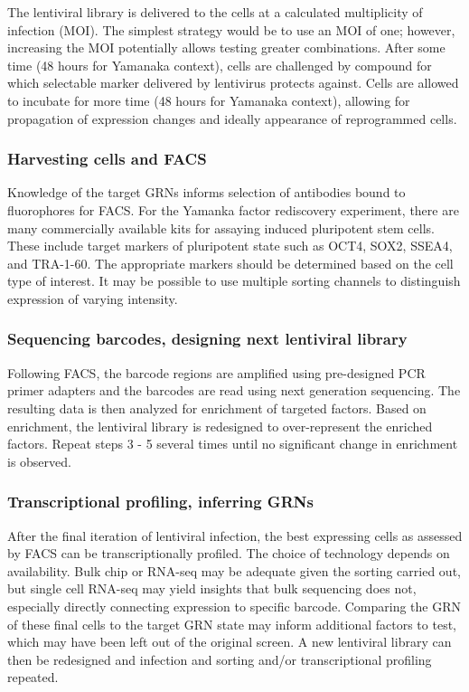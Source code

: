 \documentclass[10pt]{article}
\begin{document}
The lentiviral library is delivered to the cells at a calculated multiplicity of infection (MOI). The simplest strategy would be to use an MOI of one; however, increasing the MOI potentially allows testing greater combinations. After some time (48 hours for Yamanaka context), cells are challenged by compound for which selectable marker delivered by lentivirus protects against. Cells are allowed to incubate for more time (48 hours for Yamanaka context), allowing for propagation of expression changes and ideally appearance of reprogrammed cells.

\subsubsection{Harvesting cells and FACS}

Knowledge of the target GRNs informs selection of antibodies bound to fluorophores for FACS. For the Yamanka factor rediscovery experiment, there are many commercially available kits for assaying induced pluripotent stem cells. These include target markers of pluripotent state such as OCT4, SOX2, SSEA4, and TRA-1-60. The appropriate markers should be determined based on the cell type of interest. It may be possible to use multiple sorting channels to distinguish expression of varying intensity.

\subsubsection{Sequencing barcodes, designing next lentiviral library}

Following FACS, the barcode regions are amplified using pre-designed PCR primer adapters \cite{cheng2014enhanced} and the barcodes are read using next generation sequencing. The resulting data is then analyzed for enrichment of targeted factors. Based on enrichment, the lentiviral library is redesigned to over-represent the enriched factors. Repeat steps 3 - 5 several times until no significant change in enrichment is observed.

\subsubsection{Transcriptional profiling, inferring GRNs}

After the final iteration of lentiviral infection, the best expressing cells as assessed by FACS can be transcriptionally profiled. The choice of technology depends on availability. Bulk chip or RNA-seq may be adequate given the sorting carried out, but single cell RNA-seq may yield insights that bulk sequencing does not, especially directly connecting expression to specific barcode. Comparing the GRN of these final cells to the target GRN state may inform additional factors to test, which may have been left out of the original screen. A new lentiviral library can then be redesigned and infection and sorting and/or transcriptional profiling repeated.
\end{document}
